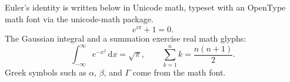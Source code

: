 \documentclass[11pt]{article}
\begin{document}
Euler's identity is written below in Unicode math, typeset with an OpenType math
font via the unicode-math package.
\[
  e^{i\pi} + 1 = 0.
\]
The Gaussian integral and a summation exercise real math glyphs:
\[
  \int_{-\infty}^{\infty} e^{-x^2}\,\mathrm{d}x = \sqrt{\pi},
  \qquad
  \sum_{k=1}^{n} k = \frac{n(n+1)}{2}.
\]
Greek symbols such as $\alpha$, $\beta$, and $\Gamma$ come from the math font.
\end{document}
